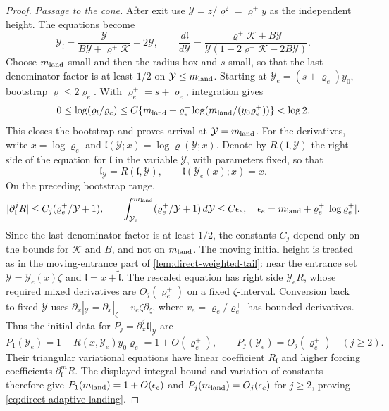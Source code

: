 \begin{proof}
\emph{Passage to the cone.}
After exit use \(\mathcal Y=z/\varrho^2=\varrho^+y\) as the independent height.
The equations become
\[
 \mathcal Y_{\mathfrak l}=\frac{\mathcal Y}{B\mathcal Y+\varrho^+\mathcal K}-2\mathcal Y,\qquad
 \frac{d\mathfrak l}{d\mathcal Y}
 =\frac{\varrho^+\mathcal K+B\mathcal Y}
        {\mathcal Y(1-2\varrho^+\mathcal K-2B\mathcal Y)} .
\]
Choose \(m_{\rm land}\) small and then the radius box and \(s\) small,
so that the last denominator factor is at least \(1/2\)
on \(\mathcal Y\le m_{\rm land}\). Starting at \(\mathcal Y_e=(s+\varrho_e)y_0\), bootstrap
\(\varrho\le2\varrho_e\). With \(\varrho_e^+=s+\varrho_e\), integration gives
\[
 0\le\log(\varrho_l/\varrho_e)
 \le C\{m_{\rm land}+\varrho_e^+\log(m_{\rm land}/(y_0\varrho_e^+))\}<\log2 .
\]
This closes the bootstrap and proves arrival at \(\mathcal Y=m_{\rm land}\).
For the derivatives, write \(x=\log\varrho_e\) and
\(\mathfrak l(\mathcal Y;x)=\log\varrho(\mathcal Y;x)\). Denote by \(R(\mathfrak l,\mathcal Y)\) the
right side of the equation for \(\mathfrak l\) in the variable \(\mathcal Y\), with
parameters fixed, so that
\[
 \mathfrak l_{\mathcal Y}=R(\mathfrak l,\mathcal Y),\qquad \mathfrak l(\mathcal Y_e(x);x)=x.
\]
On the preceding bootstrap range,
\[
 |\partial_{\mathfrak l}^jR|\le C_j(\varrho_e^+/\mathcal Y+1),\qquad
 \int_{\mathcal Y_e}^{m_{\rm land}}(\varrho_e^+/\mathcal Y+1)\,d\mathcal Y
       \le C\epsilon_e,\quad
 \epsilon_e=m_{\rm land}+\varrho_e^+|\log \varrho_e^+|.
\]
Since the last denominator factor is at least \(1/2\), the constants
\(C_j\) depend only on the bounds for \(\mathcal K\) and \(B\), and not on
\(m_{\rm land}\).
The moving initial height is treated as in the moving-entrance part
of \cref{lem:direct-weighted-tail}: near the entrance set
\(\mathcal Y=\mathcal Y_e(x)\zeta\) and
\(\mathfrak l=x+\tilde{\mathfrak l}\). The rescaled equation has
right side \(\mathcal Y_eR\), whose required mixed derivatives are
\(O_j(\varrho_e^+)\) on a fixed \(\zeta\)-interval. Conversion back to
fixed \(\mathcal Y\) uses
\(\partial_x|_{\mathcal Y}=\partial_x|_\zeta-v_e\zeta\partial_\zeta\),
where \(v_e=\varrho_e/\varrho_e^+\) has bounded derivatives. Thus the
initial data for \(P_j=\partial_x^j\mathfrak l|_{\mathcal Y}\) are
\[
 P_1(\mathcal Y_e)=1-R(x,\mathcal Y_e)y_0\varrho_e
       =1+O(\varrho_e^+),\qquad
 P_j(\mathcal Y_e)=O_j(\varrho_e^+)\quad(j\ge2).
\]
Their triangular variational equations have linear coefficient
\(R_{\mathfrak l}\) and higher forcing coefficients
\(\partial_{\mathfrak l}^mR\). The displayed integral bound and
variation of constants therefore give
\(P_1(m_{\rm land})=1+O(\epsilon_e)\) and
\(P_j(m_{\rm land})=O_j(\epsilon_e)\) for \(j\ge2\), proving
\eqref{eq:direct-adaptive-landing}.


\end{proof}
